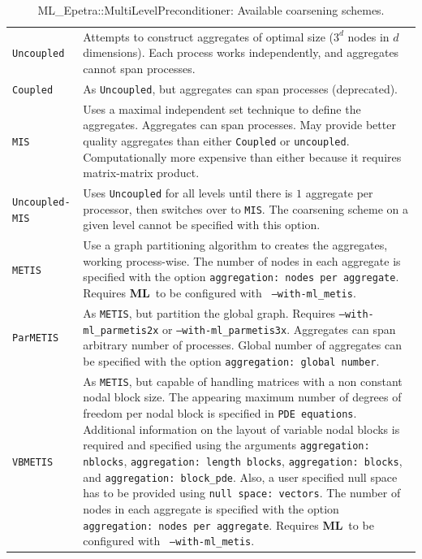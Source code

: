 \documentclass{article}[11pt]
\newcommand{\ML}     {{\bf ML}}
\begin{document}
\begin{table}[tbh]
\begin{center}
\begin{tabular}{ | p{4cm} | p{10cm} | }
\hline
\verb!Uncoupled! & Attempts to construct
aggregates of optimal size ($3^d$ nodes in $d$ dimensions).
Each process works independently, and aggregates cannot span processes.\\
\verb!Coupled! & As \verb!Uncoupled!, but aggregates can span processes (deprecated).\\
\verb!MIS! & Uses a maximal independent set technique to define the
aggregates. Aggregates can span
processes. May provide better quality aggregates than either \verb!Coupled! or
\verb!uncoupled!.
Computationally more expensive than either because it requires
matrix-matrix product. \\
\verb!Uncoupled-MIS! & Uses \verb!Uncoupled! for all levels until there is $1$
aggregate per processor,  then switches over to \verb!MIS!.
The coarsening scheme on a given level cannot be specified with this option.\\
\verb!METIS! & Use a graph partitioning algorithm to creates the
aggregates, working process-wise. The number of nodes in each aggregate
is specified with the option {\tt aggregation: nodes per
  aggregate}. Requires \ML\ to be configured with {\tt
  --with-ml\_metis}. \\
\verb!ParMETIS! & As \verb!METIS!, but partition the global
graph. Requires {\tt --with-ml\_parmetis2x} or {\tt --with-ml\_parmetis3x}. Aggregates can span
arbitrary number of processes. Global number of aggregates can be
specified with the option {\tt aggregation: global number}. \\
\verb!VBMETIS! & As \verb!METIS!, but capable of handling matrices with a non 
constant nodal block size.
The appearing maximum number of degrees of freedom per nodal block is specified
in {\tt PDE equations}. Additional information on the layout of variable nodal blocks 
is required and specified using the arguments 
{\tt aggregation: nblocks}, 
{\tt aggregation: length blocks}, 
{\tt aggregation: blocks}, and 
{\tt aggregation: block\_pde}.
Also, a user specified null space has to be provided using
{\tt null space: vectors}.
The number of nodes in each aggregate
is specified with the option {\tt aggregation: nodes per
  aggregate}. 
  Requires \ML\ to be configured with {\tt
  --with-ml\_metis}. \\
\hline
\end{tabular}
\caption{ML\_Epetra::MultiLevelPreconditioner: Available coarsening schemes.}
\label{tab:ml:aggr}
\end{center}
\end{table}
\end{document}
